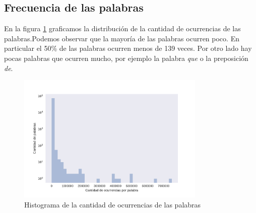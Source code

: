 \subsection{Frecuencia de las palabras}
\label{sub: frecuenciaPalabras}
En la figura \ref{fig:cantPalabras} graficamos la distribución de la cantidad de ocurrencias de las palabras.Podemos observar que la mayoría de las palabras ocurren poco. En particular el 50\% de las palabras ocurren menos de 139 veces. Por otro lado hay pocas palabras que ocurren mucho, por ejemplo la palabra \textit{que} o la preposición \textit{de}.

\begin{figure}[ht]
\centering
\includegraphics[width=0.8\textwidth]{./images/DistribucionOcurrenciasPalabras.pdf} 
\caption{Histograma de la cantidad de ocurrencias de las palabras} 
\label{fig:cantPalabras} 
\end{figure}

